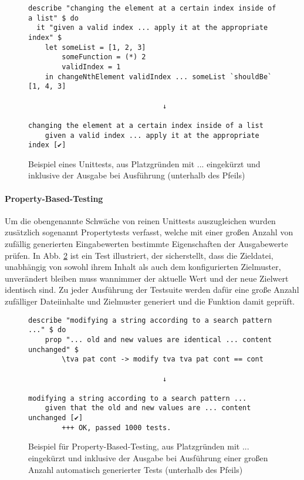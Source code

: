 \begin{figure}
    \caption{Beispiel eines Unittests, aus Platzgründen mit ... eingekürzt und inklusive
        der Ausgabe bei Ausführung (unterhalb des Pfeils)}
    \label{unit-test}
    \begin{verbatim}
describe "changing the element at a certain index inside of a list" $ do
  it "given a valid index ... apply it at the appropriate index" $
    let someList = [1, 2, 3]
        someFunction = (*) 2
        validIndex = 1
    in changeNthElement validIndex ... someList `shouldBe` [1, 4, 3]

                                ↓

changing the element at a certain index inside of a list
    given a valid index ... apply it at the appropriate index [✔]
    \end{verbatim}
\end{figure}

\paragraph{\gls{Property-Based-Testing}}
Um die obengenannte Schwäche von reinen Unittests auszugleichen wurden zusätzlich
sogenannt Propertytests verfasst, welche mit einer großen Anzahl von zufällig generierten
Eingabewerten bestimmte Eigenschaften der Ausgabewerte prüfen. In Abb. \ref{property-test}
ist ein Test illustriert, der sicherstellt, dass die Zieldatei, unabhängig von
sowohl ihrem Inhalt als auch dem konfigurierten \gls{Zielmuster}, unverändert
bleiben muss wannimmer der aktuelle Wert und der neue Zielwert identisch sind. Zu
jeder Ausführung der Testsuite werden dafür eine große Anzahl zufälliger Dateiinhalte
und Zielmuster generiert und die Funktion damit geprüft.

\begin{figure}
    \caption{Beispiel für \gls{Property-Based-Testing}, aus Platzgründen mit ... eingekürzt und inklusive
        der Ausgabe bei Ausführung einer großen Anzahl automatisch generierter Tests (unterhalb des Pfeils)}
    \label{property-test}
    \begin{verbatim}
describe "modifying a string according to a search pattern ..." $ do
    prop "... old and new values are identical ... content unchanged" $
        \tva pat cont -> modify tva tva pat cont == cont

                                ↓

modifying a string according to a search pattern ...
    given that the old and new values are ... content unchanged [✔]
        +++ OK, passed 1000 tests.
    \end{verbatim}
\end{figure}